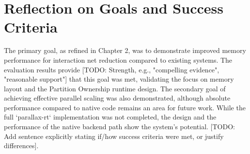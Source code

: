 \section{Reflection on Goals and Success Criteria} %
The primary goal, as refined in Chapter 2, was to demonstrate improved memory performance for interaction net reduction compared to existing systems. The evaluation results provide [TODO: Strength, e.g., "compelling evidence", "reasonable support"] that this goal was met, validating the focus on memory layout and the Partition Ownership runtime design. The secondary goal of achieving effective parallel scaling was also demonstrated, although absolute performance compared to native code remains an area for future work. While the full `parallax-rt` implementation was not completed, the design and the performance of the native backend path show the system's potential. [TODO: Add sentence explicitly stating if/how success criteria were met, or justify differences].

